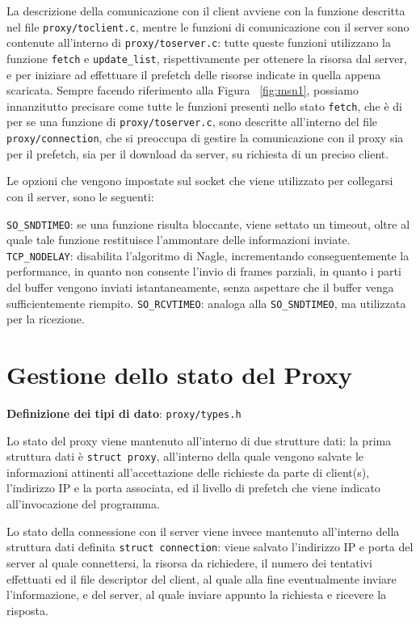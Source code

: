 La descrizione della comunicazione con il client avviene con la funzione
descritta nel file \texttt{proxy/toclient.c}, mentre le funzioni di comunicazione con
il server sono contenute all'interno di \texttt{proxy/toserver.c}: tutte queste
funzioni utilizzano la funzione \texttt{fetch} e \texttt{update\_list}, rispettivamente
per ottenere la risorsa dal server, e per iniziare ad effettuare il prefetch
delle risorse indicate in quella appena scaricata.
Sempre facendo riferimento alla Figura ~\vref{fig:msn1}, possiamo innanzitutto
precisare come tutte le funzioni presenti nello stato \texttt{fetch}, che è di per
se una funzione di \texttt{proxy/toserver.c}, sono descritte all'interno del file
\texttt{proxy/connection}, che si preoccupa di gestire la comunicazione con il
proxy sia per il prefetch, sia per il download da server, su richiesta di un
preciso client.

Le opzioni che vengono impostate sul socket che viene utilizzato per collegarsi
con il server, sono le seguenti:
\begin{itemize}
\diam \texttt{SO\_SNDTIMEO}: se una funzione risulta bloccante, viene settato un
	timeout, oltre al quale tale funzione restituisce l'ammontare delle
	informazioni inviate.
\diam \texttt{TCP\_NODELAY}: disabilita l'algoritmo di Nagle, incrementando 
	conseguentemente la performance, in quanto non consente l'invio di
	frames parziali, in quanto i parti del buffer vengono inviati
	istantaneamente, senza aspettare che il buffer venga sufficientemente
	riempito.
\diam \texttt{SO\_RCVTIMEO}: analoga alla \texttt{SO\_SNDTIMEO}, ma utilizzata per la
	ricezione.
\end{itemize}

\section{Gestione dello stato del Proxy}
\begin{itemize}
\diam \textbf{Definizione dei tipi di dato}: \texttt{proxy/types.h} 
\end{itemize}
Lo stato del proxy viene mantenuto all'interno di due strutture dati: la prima
struttura dati è \texttt{struct proxy}, all'interno della quale vengono salvate le
informazioni attinenti all'accettazione delle richieste da parte di client(s),
l'indirizzo IP e la porta associata, ed il livello di prefetch che viene indicato
all'invocazione del programma.

Lo stato della connessione con il server viene invece mantenuto all'interno
della struttura dati definita \texttt{struct connection}: viene salvato l'indirizzo
IP e porta del server al quale connettersi, la risorsa da richiedere, il numero
dei tentativi effettuati ed il file descriptor del client, al quale alla fine
eventualmente inviare l'informazione, e del server, al quale inviare appunto
la richiesta e ricevere la risposta.
